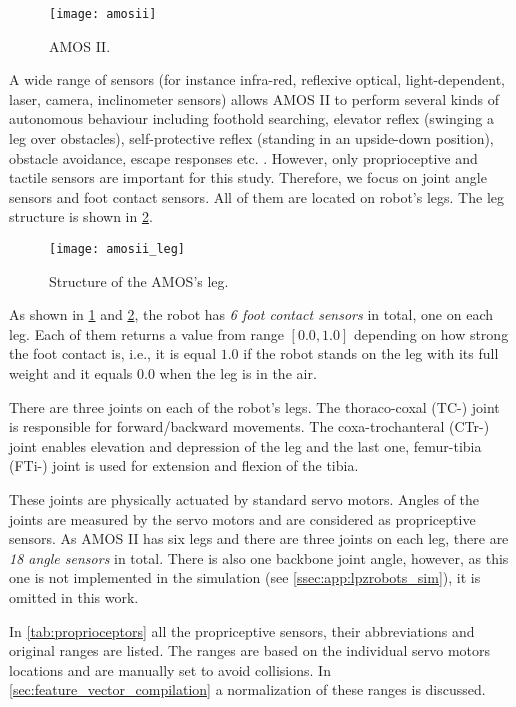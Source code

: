 \begin{figure}[H]
  \centering
  \texttt{[image: amosii]}
  \caption{AMOS II. \citep{misc:amosii}}
  \label{img:amosii}
\end{figure}

A wide range of sensors (for instance infra-red, reflexive optical, light-dependent, laser, camera, inclinometer sensors) allows AMOS II to perform several kinds of autonomous behaviour including foothold searching, elevator reflex (swinging a leg over obstacles), self-protective reflex (standing in an upside-down position), obstacle avoidance, escape responses etc. \citep{misc:amosii}. However, only proprioceptive and tactile sensors are important for this study. Therefore, we focus on joint angle sensors and foot contact sensors. All of them are located on robot's legs. The leg structure is shown in \cref{img:amosii_leg}.

\begin{figure}[H]
  \centering
  \texttt{[image: amosii\_leg]}
  \caption{Structure of the AMOS's leg. \citep{misc:amosii}}
  \label{img:amosii_leg}
\end{figure}

As shown in \cref{img:amosii} and \cref{img:amosii_leg}, the robot has \textit{6 foot contact sensors} in total, one on each leg. Each of them returns a value from range $ [0.0, 1.0] $ depending on how strong the foot contact is, i.e., it is equal $ 1.0 $ if the robot stands on the leg with its full weight and it equals $ 0.0 $ when the leg is in the air.

There are three joints on each of the robot's legs. The thoraco-coxal (TC-) joint is responsible for forward/backward movements. The coxa-trochanteral (CTr-) joint enables elevation and depression of the leg and the last one, femur-tibia (FTi-) joint is used for extension and flexion of the tibia.

These joints are physically actuated by standard servo motors. Angles of the joints are measured by the servo motors and are considered as propriceptive sensors. As AMOS II has six legs and there are three joints on each leg, there are \textit{18 angle sensors} in total. There is also one backbone joint angle, however, as this one is not implemented in the simulation (see \cref{ssec:app:lpzrobots_sim}), it is omitted in this work.

In \cref{tab:proprioceptors} all the propriceptive sensors, their abbreviations and original ranges are listed. The ranges are based on the individual servo motors locations and are manually set to avoid collisions. In \cref{sec:feature_vector_compilation} a normalization of these ranges is discussed.

